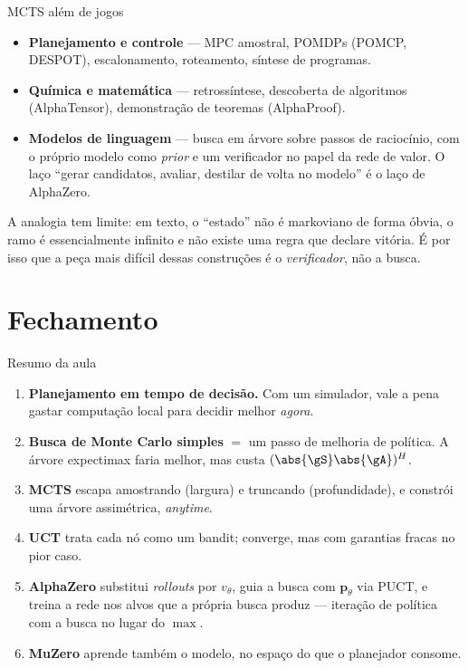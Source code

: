 \documentclass[aspectratio=169, 11pt]{beamer}
\begin{document}
\begin{frame}{MCTS além de jogos}
  \begin{itemize}
    \item \textbf{Planejamento e controle} --- MPC amostral, POMDPs (POMCP,
          DESPOT), escalonamento, roteamento, síntese de programas.
    \item \textbf{Química e matemática} --- retrossíntese, descoberta de
          algoritmos (AlphaTensor), demonstração de teoremas (AlphaProof).
    \item \textbf{Modelos de linguagem} --- busca em árvore sobre passos de
          raciocínio, com o próprio modelo como \emph{prior} e um verificador
          no papel da rede de valor. O laço ``gerar candidatos, avaliar,
          destilar de volta no modelo'' é o laço de AlphaZero.
  \end{itemize}

  \pause
  \begin{alertabox}
    A analogia tem limite: em texto, o ``estado'' não é markoviano de forma
    óbvia, o ramo é essencialmente infinito e não existe uma regra que declare
    vitória. É por isso que a peça mais difícil dessas construções é o
    \emph{verificador}, não a busca.
  \end{alertabox}
\end{frame}

\section{Fechamento}

\begin{frame}{Resumo da aula}
  \begin{enumerate}
    \item \textbf{Planejamento em tempo de decisão.} Com um simulador, vale a
          pena gastar computação local para decidir melhor \emph{agora}.
    \item \textbf{Busca de Monte Carlo simples} $=$ um passo de melhoria de
          política. A árvore expectimax faria melhor, mas custa
          $(\abs{\gS}\abs{\gA})^H$.
    \item \textbf{MCTS} escapa amostrando (largura) e truncando (profundidade),
          e constrói uma árvore assimétrica, \emph{anytime}.
    \item \textbf{UCT} trata cada nó como um bandit; converge, mas com garantias
          fracas no pior caso.
    \item \textbf{AlphaZero} substitui \emph{rollouts} por $v_\theta$, guia a
          busca com $\bm{p}_\theta$ via PUCT, e treina a rede nos alvos que a
          própria busca produz --- iteração de política com a busca no lugar do
          $\max$.
    \item \textbf{MuZero} aprende também o modelo, no espaço do que o
          planejador consome.
  \end{enumerate}
\end{frame}
\end{document}
